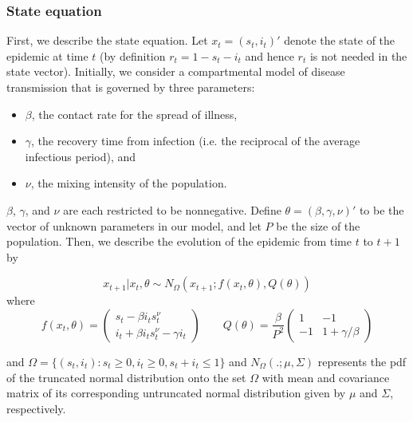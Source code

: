 \documentclass{elsarticle}
\begin{document}
\subsubsection{State equation \label{sec:state}}

First, we describe the state equation. Let $x_t = (s_t,i_t)'$ denote the state of the epidemic at time $t$ (by definition $r_t=1-s_t-i_t$ and hence $r_t$ is not needed in the state vector). Initially, we consider a compartmental model of disease transmission that is governed by three parameters:

\begin{itemize}
\item $\beta$, the contact rate for the spread of illness,
\item $\gamma$, the recovery time from infection (i.e. the reciprocal of the average infectious period), and
\item $\nu$, the mixing intensity of the population.
\end{itemize}

\noindent $\beta$, $\gamma$, and $\nu$ are each restricted to be nonnegative. Define $\theta = (\beta,\gamma,\nu)'$ to be the vector of unknown parameters in our model, and let $P$ be the size of the population. Then, we describe the evolution of the epidemic from time $t$ to $t + 1$ by

\begin{equation}
x_{t+1}\left|x_t,\theta\right. \sim N_\Omega\left(x_{t+1};f(x_t,\theta),Q(\theta)\right) \label{eqn:state}
\end{equation}
\noindent where
\[
f(x_t,\theta) = \left(
\begin{array}{c}
s_t - \beta i_ts^\nu_t \phantom{- \gamma i_t}\,\, \\
i_t +  \beta i_ts^\nu_t - \gamma i_t
\end{array}
\right)
\qquad
Q(\theta) = \frac{\beta}{P^2} \left(
\begin{array}{ccccc}
1 & -1 \\
-1 & 1 + \gamma/\beta
\end{array}
\right)
\]

\noindent and $\Omega = \{(s_t,i_t): s_t \ge 0, i_t \ge 0, s_t + i_t \le 1\}$ and $N_{\Omega}(.; \mu,\Sigma)$ represents the pdf of the truncated normal distribution onto the set $\Omega$ with mean and covariance matrix of its corresponding untruncated normal distribution given by $\mu$ and $\Sigma$, respectively.
\end{document}
